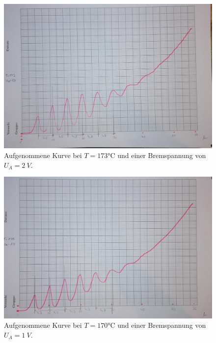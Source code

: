 \begin{figure}[H]
    \centering
    \includegraphics[scale=0.25]{content/Kurve173.jpg}
    \caption{Aufgenommene Kurve bei $T = 173\unit{\degreeCelsius}$ und einer Bremspannung von $U_A = \qty{2}{V}$.}
    \label{fig:173}
\end{figure}

\begin{figure}[H]
    \centering
    \includegraphics[scale=0.25]{content/Kurve170.jpg}
    \caption{Aufgenommene Kurve bei $T = 170\unit{\degreeCelsius}$ und einer Bremspannung von $U_A = \qty{1}{V}$.}
    \label{fig:170}
\end{figure}